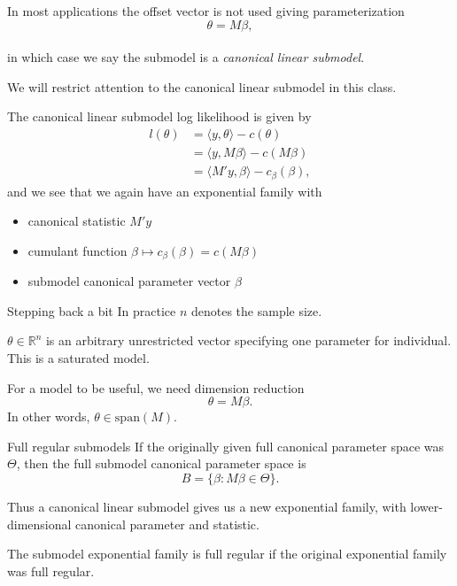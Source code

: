 \documentclass[
  ignorenonframetext,
]{beamer}
\providecommand{\tightlist}{%
  \setlength{\itemsep}{0pt}\setlength{\parskip}{0pt}}
\begin{document}
\begin{frame}{}
\protect\hypertarget{section}{}
In most applications the offset vector is not used giving
parameterization \[
  \theta = M\beta,
\]\\
in which case we say the submodel is a \emph{canonical linear submodel}.

We will restrict attention to the canonical linear submodel in this
class.
\end{frame}

\begin{frame}{}
\protect\hypertarget{section-1}{}
The canonical linear submodel log likelihood is given by
\begin{equation} \label{subloglike}
\begin{split}
  l(\theta) &= \langle y,\theta\rangle - c(\theta) \\
    &= \langle y,M\beta\rangle - c(M\beta) \\
    &= \langle M'y,\beta\rangle - c_\beta(\beta),   
\end{split}
\end{equation} and we see that we again have an exponential family with

\begin{itemize}
\tightlist
\item
  canonical statistic \(M'y\)
\item
  cumulant function \(\beta \mapsto c_\beta(\beta) = c(M\beta)\)
\item
  submodel canonical parameter vector \(\beta\)
\end{itemize}
\end{frame}

\begin{frame}{Stepping back a bit}
\protect\hypertarget{stepping-back-a-bit}{}
In practice \(n\) denotes the sample size.

\(\theta \in \mathbb{R}^n\) is an arbitrary unrestricted vector
specifying one parameter for individual. This is a saturated model.

For a model to be useful, we need dimension reduction \[
  \theta = M\beta.
\] In other words, \(\theta \in \text{span}(M)\).
\end{frame}

\begin{frame}{Full regular submodels}
\protect\hypertarget{full-regular-submodels}{}
If the originally given full canonical parameter space was \(\Theta\),
then the full submodel canonical parameter space is \[
  B = \{\beta : M\beta \in \Theta\}.
\]

Thus a canonical linear submodel gives us a new exponential family, with
lower-dimensional canonical parameter and statistic.

The submodel exponential family is full regular if the original
exponential family was full regular.
\end{frame}
\end{document}
